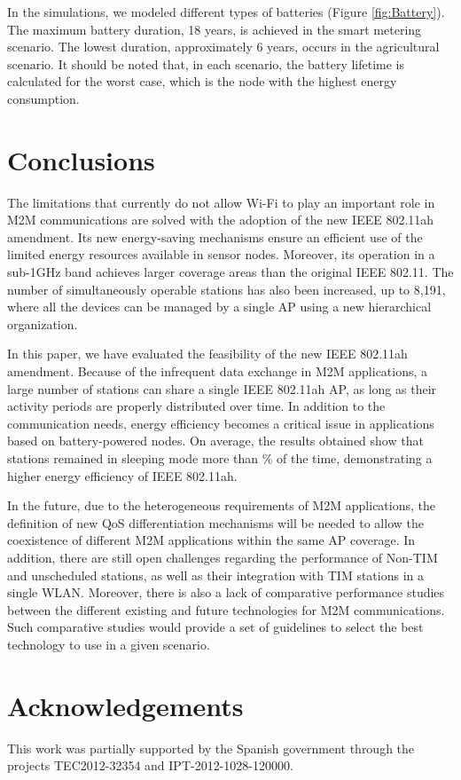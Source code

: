 \documentclass[]{article}
\begin{document}
In the simulations, we modeled different types of batteries (Figure \ref{fig:Battery}). The maximum battery duration, 18 years, is achieved in the smart metering scenario. The lowest duration, approximately 6 years, occurs in the agricultural scenario. It should be noted that, in each scenario, the battery lifetime is calculated for the worst case, which is the node with the highest energy consumption.

\section{Conclusions} \label{conclusions}

The limitations that currently do not allow Wi-Fi to play an important role in M2M communications are solved with the adoption of the new IEEE 802.11ah amendment. Its new energy-saving mechanisms ensure an efficient use of the limited energy resources available in sensor nodes. Moreover, its operation in a sub-1GHz band achieves larger coverage areas than  the original IEEE 802.11. The number of simultaneously operable stations has also been increased, up to 8,191, where all the devices can be managed by a single AP using a new hierarchical organization.

In this paper, we have evaluated the feasibility of the new IEEE 802.11ah amendment. Because of the infrequent data exchange in M2M applications, a large number of stations can share a single IEEE 802.11ah AP, as long as their activity periods are properly distributed over time. In addition to the communication needs, energy efficiency becomes a critical issue in applications based on battery-powered nodes. On average, the results obtained show that stations remained in sleeping mode more than \% of the time, demonstrating a higher energy efficiency of IEEE 802.11ah.

In the future, due to the heterogeneous requirements of M2M applications, the definition of new QoS differentiation mechanisms will be needed to allow the coexistence of different M2M applications within the same AP coverage. In addition, there are still open challenges regarding the performance of Non-TIM and unscheduled stations, as well as their integration with TIM stations in a single WLAN. Moreover, there is also a lack of comparative performance studies between the different existing and future technologies for M2M communications. Such comparative studies would provide a set of guidelines to select the best technology to use in a given scenario.

\section*{Acknowledgements}
This work was partially supported by the Spanish government through the projects TEC2012-32354 and IPT-2012-1028-120000.




\end{document}
